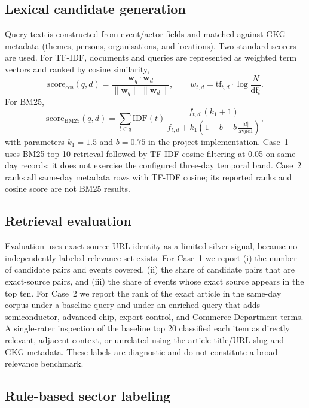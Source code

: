 \documentclass[10pt,a4paper,twocolumn]{article}
\begin{document}
\subsection{Lexical candidate generation}

Query text is constructed from event/actor fields and matched against GKG metadata (themes, persons, organisations, and locations). Two standard scorers are used. For TF-IDF, documents and queries are represented as weighted term vectors and ranked by cosine similarity,
\begin{equation}
  \mathrm{score}_{\mathrm{cos}}(q,d) = \frac{\mathbf{w}_q \cdot \mathbf{w}_d}{\lVert \mathbf{w}_q\rVert\,\lVert \mathbf{w}_d\rVert},
  \qquad w_{t,d} = \mathrm{tf}_{t,d}\cdot \log\frac{N}{\mathrm{df}_t}.
\end{equation}
For BM25,
\begin{equation}
  \mathrm{score}_{\mathrm{BM25}}(q,d) = \sum_{t\in q} \mathrm{IDF}(t)\,
  \frac{f_{t,d}\,(k_1+1)}{f_{t,d} + k_1\!\left(1-b+b\,\frac{|d|}{\mathrm{avgdl}}\right)},
\end{equation}
with parameters $k_1=1.5$ and $b=0.75$ in the project implementation. Case~1 uses BM25 top-10 retrieval followed by TF-IDF cosine filtering at 0.05 on same-day records; it does not exercise the configured three-day temporal band. Case~2 ranks all same-day metadata rows with TF-IDF cosine; its reported ranks and cosine score are not BM25 results.

\subsection{Retrieval evaluation}

Evaluation uses exact source-URL identity as a limited silver signal, because no independently labeled relevance set exists. For Case~1 we report (i) the number of candidate pairs and events covered, (ii) the share of candidate pairs that are exact-source pairs, and (iii) the share of events whose exact source appears in the top ten. For Case~2 we report the rank of the exact article in the same-day corpus under a baseline query and under an enriched query that adds semiconductor, advanced-chip, export-control, and Commerce Department terms. A single-rater inspection of the baseline top 20 classified each item as directly relevant, adjacent context, or unrelated using the article title/URL slug and GKG metadata. These labels are diagnostic and do not constitute a broad relevance benchmark.

\subsection{Rule-based sector labeling}
\end{document}
